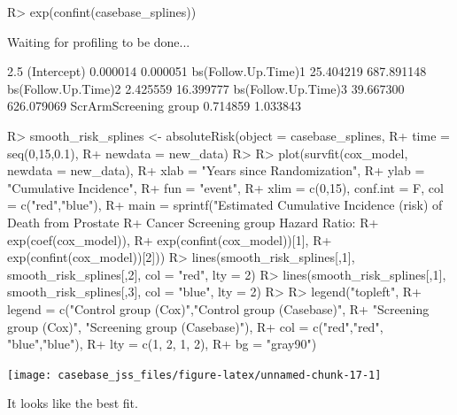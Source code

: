 \documentclass[article]{jss}
\begin{document}
\begin{CodeChunk}
\begin{CodeInput}
R> exp(confint(casebase_splines))
\end{CodeInput}

\begin{CodeOutput}
Waiting for profiling to be done...
\end{CodeOutput}

\begin{CodeOutput}
                          2.5 %
(Intercept)            0.000014   0.000051
bs(Follow.Up.Time)1   25.404219 687.891148
bs(Follow.Up.Time)2    2.425559  16.399777
bs(Follow.Up.Time)3   39.667300 626.079069
ScrArmScreening group  0.714859   1.033843
\end{CodeOutput}
\end{CodeChunk}

\begin{CodeChunk}

\begin{CodeInput}
R> smooth_risk_splines <- absoluteRisk(object = casebase_splines, 
R+                                     time = seq(0,15,0.1), 
R+                                     newdata = new_data)
R> 
R> plot(survfit(cox_model, newdata = new_data),
R+      xlab = "Years since Randomization", 
R+      ylab = "Cumulative Incidence", 
R+      fun = "event",
R+      xlim = c(0,15), conf.int = F, col = c("red","blue"), 
R+      main = sprintf("Estimated Cumulative Incidence (risk) of Death from Prostate 
R+                     Cancer Screening group Hazard Ratio: %
R+                     exp(coef(cox_model)), 
R+                     exp(confint(cox_model))[1], 
R+                     exp(confint(cox_model))[2]))
R> lines(smooth_risk_splines[,1], smooth_risk_splines[,2], col = "red", lty = 2)
R> lines(smooth_risk_splines[,1], smooth_risk_splines[,3], col = "blue", lty = 2)
R> 
R> legend("topleft", 
R+        legend = c("Control group (Cox)","Control group (Casebase)",
R+                   "Screening group (Cox)", "Screening group (Casebase)"), 
R+        col = c("red","red", "blue","blue"),
R+        lty = c(1, 2, 1, 2), 
R+        bg = "gray90")
\end{CodeInput}


\begin{center}\texttt{[image: casebase\_jss\_files/figure-latex/unnamed-chunk-17-1]} \end{center}

\end{CodeChunk}

It looks like the best fit.
\end{document}
